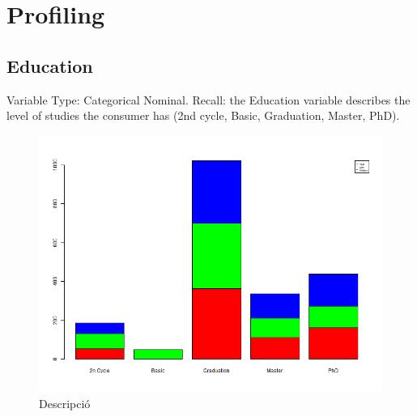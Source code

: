 \section{Profiling}

\subsection{Education}
Variable Type: Categorical Nominal. 
Recall: the Education variable describes the level of studies the consumer has (2nd cycle, Basic, Graduation, Master, PhD).

\begin{figure}[H]
    \centering
    \includegraphics[width= 1\linewidth]{Imatges/stacked_barplot_counts_IncomeSegment_10_legend(education).png}
    \caption{Descripció}
    \label{fig:scree_plot_1} %
\end{figure}

